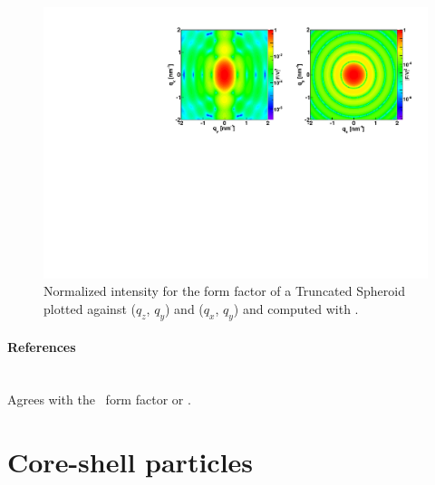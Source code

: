 \begin{figure}[H]
\begin{center}
\includegraphics[angle=-90,width=\textwidth]{fig/ff/figffspheroid.pdf}
\end{center}
\caption{Normalized intensity for the form factor of a Truncated Spheroid plotted against ($q_z$, $q_y$) and ($q_x$, $q_y$) and
  computed with .}
\label{fig:FFspheroidEx}
\end{figure}

\paragraph{References}\strut\\
Agrees with the \IsGISAXS\ form factor
 \cite[Eq.~2.33]{Laz08} or
 \cite[Eq.~228]{ReLL09}.



\clearpage
\section{Core-shell particles} \label{sec:CoreShell}

